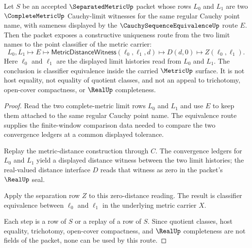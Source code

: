 \begin{theorem}\label{thm:separatedmetric-completion-limit-uniqueness-route}
Let $S$ be an accepted $\SeparatedMetricUp$ packet whose rows $L_0$ and $L_1$ are two $\CompleteMetricUp$ Cauchy-limit witnesses for the same regular Cauchy point name, with sameness displayed by the $\CauchySequenceEquivalenceUp$ route $E$. Then the packet exposes a constructive uniqueness route from the two limit names to the point classifier of the metric carrier:
$$
L_0,L_1\longmapsto E\longmapsto \mathsf{MetricDistanceWitness}(\ell_0,\ell_1,d)\longmapsto D(d,0)\longmapsto Z(\ell_0,\ell_1).
$$
Here $\ell_0$ and $\ell_1$ are the displayed limit histories read from $L_0$ and $L_1$. The conclusion is classifier equivalence inside the carried $\MetricUp$ surface. It is not host equality, not equality of quotient classes, and not an appeal to trichotomy, open-cover compactness, or $\RealUp$ completeness.
\end{theorem}
\begin{proof}
Read the two complete-metric limit rows $L_0$ and $L_1$ and use $E$ to keep them attached to the same regular Cauchy point name. The equivalence route supplies the finite-window comparison data needed to compare the two convergence ledgers at a common displayed tolerance.

Replay the metric-distance construction through $C$. The convergence ledgers for $L_0$ and $L_1$ yield a displayed distance witness between the two limit histories; the real-valued distance interface $D$ reads that witness as zero in the packet's $\RealUp$ seal.

Apply the separation row $Z$ to this zero-distance reading. The result is classifier equivalence between $\ell_0$ and $\ell_1$ in the underlying metric carrier $X$.

Each step is a row of $S$ or a replay of a row of $S$. Since quotient classes, host equality, trichotomy, open-cover compactness, and $\RealUp$ completeness are not fields of the packet, none can be used by this route.
\end{proof}

